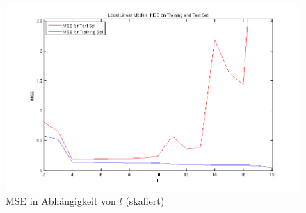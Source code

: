 \begin{figure}[h!]
  \centering
  \includegraphics[width=\textwidth]{./figures/1_1_3_mse_in.png}
  \caption{MSE in Abhängigkeit von $l$ (skaliert)}
  \label{fig:113-mse-in}
\end{figure}

\clearpage